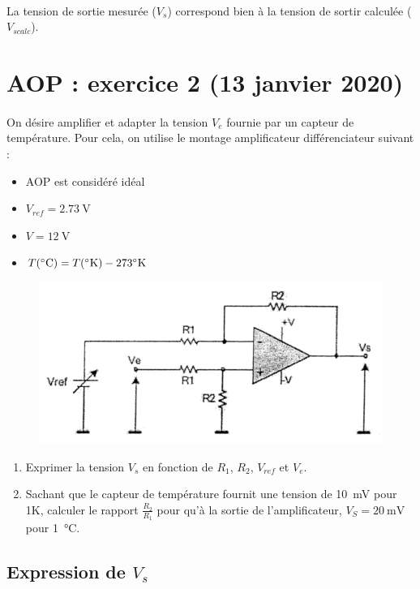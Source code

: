 \documentclass{article}
\begin{document}
\paragraph{}La tension de sortie mesurée ($V_s$) correspond bien à la tension de sortir calculée ($V_{scalc}$).

\newpage
\section{AOP : exercice 2 (13 janvier 2020)}
\paragraph{}
On désire amplifier et adapter la tension $V_e$ fournie par un capteur de température. Pour cela, on utilise le montage amplificateur différenciateur suivant :
\begin{itemize}
    \item AOP est considéré idéal
    \item $V_{ref} = \SI{2.73}{\volt}$
    \item $V = \SI{12}{\volt}$
    \item $T(\si{\celsius}) = T(\degree\si{\kelvin}) - 273\degree\si{\kelvin}$
\end{itemize}
\begin{figure}[H]
    \centering
    \includegraphics[width=0.5\linewidth]{./images/AOP2.png}
\end{figure}

\begin{enumerate}
    \item Exprimer la tension $V_s$ en fonction de $R_1$, $R_2$, $V_{ref}$ et $V_e$.
    \item Sachant que le capteur de température fournit une tension de \SI{10}{\milli\volt} pour 1\degree\si{\kelvin}, calculer le rapport $\frac{R_2}{R_1}$ pour qu'à la sortie de l'amplificateur, $V_S = \SI{20}{\milli\volt}$ pour \SI{1}{\celsius}.
\end{enumerate}

\subsection{Expression de $V_s$}
\end{document}
